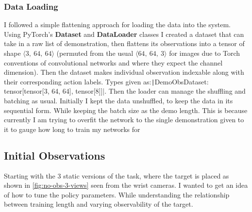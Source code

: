 \subsubsection{Data Loading}\label{subsec:reach-data-loading}
I followed a simple flattening approach for loading the data into the system. Using PyTorch's \textbf{Dataset} and \textbf{DataLoader} classes I created a dataset that can take in a raw list of demonstration, then flattens its observations into a tensor of shape \(\langle 3,~64,~64 \rangle \) (permuted from the usual \(\langle 64,~64,~3 \rangle \) for images due to Torch conventions of convolutional networks and where they expect the channel  dimension). Then the dataset makes individual observation indexable along with their corresponding action labels. Types given as:\texttt|DemoObsDataset: tensor[tensor[3,  64, 64], tensor[8]]|. Then the loader can manage the shuffling and batching as usual. Initially I kept the data unshuffled, to keep the data in its sequential form. While keeping the batch size as the demo length. This is because currently I am trying to overfit the network to the single demonstration given to it to gauge how long to train my networks for

\subsection{Initial Observations}
Starting with the 3 static versions of the task, where the target is placed as shown in \ref{fig:no-obs-3-views} seen from the wrist cameras. I wanted to get an idea of how to tune the policy parameters. While understanding the relationship between training length and varying observability of the target.

